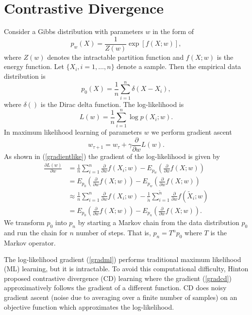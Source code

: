 \documentclass[11pt]{article}
\def\L{L}
\def\I{X}
\begin{document}
\section{Contrastive Divergence}

Consider a Gibbs distribution with parameters $w$ in the form of
\begin{equation}
p_w(\I)=\frac{1}{Z(w)}\exp\left[ f(\I;w) \right],\label{gibbs}
\end{equation}
where $Z(w)$ denotes the intractable partition function and $f(\I;w)$ is the energy function. Let $\{\I_i, i=1,\ldots,n\}$ denote a sample. Then the empirical data distribution is
\begin{equation}
p_0(\I)=\frac{1}{n}\sum_{i=1}^n \delta(\I-\I_i),\label{data}
\end{equation}
where $\delta()$ is the Dirac delta function. The log-likelihood is
\begin{equation}
\L(w) = \frac{1}{n} \sum_{i=1}^n \log p(\I_i;w) \label{like}.
\end{equation}
In maximum likelihood learning of parameters $w$ we perform gradient ascent
\begin{equation}
w_{\tau+1} = w_{\tau} + \gamma \frac{\partial}{\partial w}\L(w).
\end{equation}
As shown in (\ref{gradientlike}) the gradient of the log-likelihood is given by
\begin{align}
\frac{\partial\L(w)}{\partial w} 
&= \frac{1}{n} \sum_{i=1}^n \frac{\partial}{\partial w} f(\I_i;w) - E_{p_w}(\frac{\partial}{\partial w} f(\I;w)) \\
&= E_{p_0}(\frac{\partial}{\partial w} f(\I;w)) - E_{p_w}(\frac{\partial}{\partial w} f(\I;w)) \label{gradml} \\
&\approx \frac{1}{n} \sum_{i=1}^n \frac{\partial}{\partial w} f(\I_i;w) - \frac{1}{\tilde n} \sum_{i=1}^{\tilde n} \frac{\partial}{\partial w} f(\tilde\I_i;w)\\
&= E_{p_0}(\frac{\partial}{\partial w} f(\I;w)) - E_{p_n}(\frac{\partial}{\partial w} f(\I;w)). \label{gradcd} 
\end{align}
We transform $p_0$ into $p_n$ by starting a Markov chain from the data distribution $p_0$ and run the chain for $n$ number of steps. That is, $p_n = T^n p_0$ where $T$ is the Markov operator.

The log-likelihood gradient (\ref{gradml}) performs traditional maximum likelihood (ML) learning, but it is intractable. To avoid this computational difficulty, Hinton proposed contrastive divergence (CD) \citep{Hinton} learning where the gradient (\ref{gradcd}) approximatively follows the gradient of a different function. CD does noisy gradient ascent (noise due to averaging over a finite number of samples) on an objective function which approximates the log-likelihood.
\end{document}
